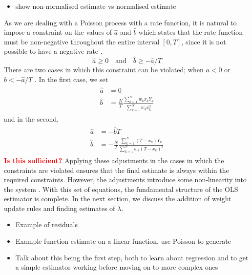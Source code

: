 \documentclass[a4paper,11pt]{article}
\begin{document}
\begin{itemize}
\item show non-normalised estimate vs normalised estimate
\end{itemize}

As we are dealing with a Poisson process with a rate function, it is natural to
impose a constraint on the values of $\hat{a}$ and $\hat{b}$ which states that
the rate function must be non-negative throughout the entire interval $[0,T]$,
since it is not possible to have a negative rate \cite{massey1996estimating}.
\begin{equation}
\hat{a}\geq 0\quad \text{and}\quad
\hat{b}\geq -\hat{a}/T
\end{equation}
There are two cases in which this constraint can be violated; when $a<0$ or
$b<-\hat{a}/T$ \cite{massey1996estimating}. In the first case, we set
\begin{align}
\begin{split}
\hat{a}&=0\\
\hat{b}&=\frac{N}{T}\frac{\displaystyle \sum_{k=1}^N w_kx_kY_k}{\displaystyle\sum_{k=1}^N w_kx_k^2}
\end{split}
\end{align}
and in the second,
\begin{align}
\begin{split}
\hat{a}&=-\hat{b}T\\
\hat{b}&=-\frac{N}{T}\frac{\displaystyle \sum_{k=1}^N (T-x_k)Y_k}{\displaystyle \sum_{k=1}^N w_k(T-x_k)^2}
\end{split}
\end{align}
\textcolor{red}{\textbf{Is this sufficient?}}
Applying these adjustments in the cases in which the constraints are violated
ensures that the final estimate is always within the required
constraints. However, the adjustments introduce some non-linearity into the
system \cite{massey1996estimating}. With this set of equations, the fundamental
structure of the OLS estimator is complete. In the next section, we discuss the
addition of weight update rules and finding estimates of $\lambda$.
\begin{itemize}
\item Example of residuals
\item Example function estimate on a linear function, use Poisson to generate
\item Talk about this being the first step, both to learn about regression and to
  get a simple estimator working before moving on to more complex ones
\end{itemize}
\end{document}

